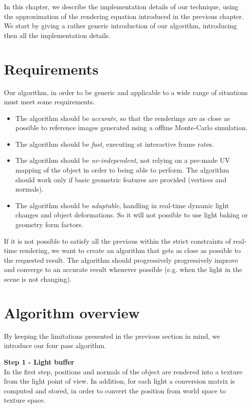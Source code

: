 In this chapter, we describe the implementation details of our technique, using the approximation of the rendering equation introduced in the previous chapter. We start by giving a rather generic introduction of our algorithm, introducing then all the implementation details. 

\section{Requirements}

Our algorithm, in order to be generic and applicable to a wide range of situations must meet some requirements. 


\begin{itemize}
  \item The algorithm should be \emph{accurate}, so that the renderings are as close as possible to reference images generated using a offline Monte-Carlo simulation. 
	\item The algorithm should be \emph{fast}, executing at interactive frame rates.
	\item The algorithm should be \emph{uv-independent}, not relying on a pre-made UV mapping of the object in order to being able to perform. The algorithm should work only if basic geometric features are provided (vertices and normals).
	\item The algorithm should be \emph{adaptable}, handling in real-time dynamic light changes and object deformations. So it will not possible to use light baking or geometry form factors.
\end{itemize}

If it is not possible to satisfy all the previous within the strict constraints of real-time rendering, we want to create an algorithm that gets as close as possible to the requested result. The algorithm should progressively progressively improve and converge to an accurate result whenever possible (e.g. when the light in the scene is not changing).

\section{Algorithm overview}

By keeping the limitations presented in the previous section in mind, we introduce our four pass algorithm.

\textbf{Step 1 - Light buffer} \\
In the first step, positions and normals of the object are rendered into a texture from the light point of view. In addition, for each light a conversion matrix is computed and stored, in order to convert the position from world space to texture space. 

